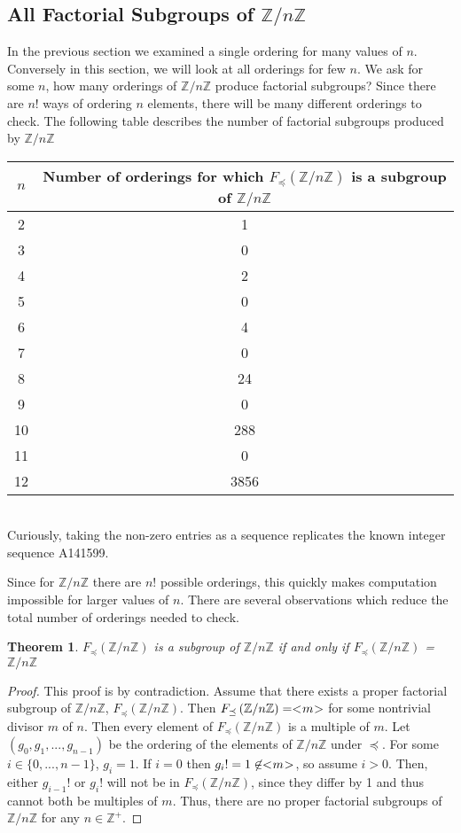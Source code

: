 \documentclass{article}
\newcommand{\ZZ}{\mathbb{Z}}
\newcommand{\ZnZ}{\ZZ/n\ZZ}
\newcommand{\FZ}{F_{\preceq}\left(\ZZ/n\ZZ\right)}
\newtheorem{theorem}{Theorem}
\begin{document}
\subsection{All Factorial Subgroups of $\ZZ/n\ZZ$}
In the previous section we examined a single ordering for many values of $n$. Conversely in this section, we will look at all orderings for few $n$. We ask for some $n$, how many orderings of $\ZZ/n\ZZ$ produce factorial subgroups? Since there are $n!$ ways of ordering $n$ elements, there will be many different orderings to check. The following table describes the number of factorial subgroups produced by $\ZZ/n\ZZ$

\begin{tabular}{|c|c|}
\hline
$n$ & Number of orderings for which $F_\preceq(\ZZ/n\ZZ)$ is a subgroup of $\ZZ/n\ZZ$\\
\hline
2 & 1\\
\hline
3 & 0\\
\hline
4 & 2\\
\hline
5 & 0\\
\hline
6 & 4\\
\hline
7 & 0\\
\hline
8 & 24\\
\hline
9 & 0\\
\hline
10 & 288\\
\hline
11 & 0\\
\hline
12 & 3856\\
\hline
\end{tabular} \vspace{0.1in}
\\Curiously, taking the non-zero entries as a sequence replicates the known integer sequence A141599.
\par Since for $\ZnZ$ there are $n!$ possible orderings, this quickly makes computation impossible for larger values of $n$. There are several observations which reduce the total number of orderings needed to check.
\begin{theorem}
$\FZ$ is a subgroup of $\ZnZ$ if and only if $\FZ$ = $\ZnZ$
\end{theorem}

\begin{proof} This proof is by contradiction. Assume that there exists a proper factorial subgroup of $\ZnZ$, $\FZ$. Then $\FZ=< \negmedspace m \negmedspace >$ for some nontrivial divisor $m$ of $n$. Then every element of $\FZ$ is a multiple of $m$. Let $(g_0,g_1,...,g_{n-1})$ be the ordering of the elements of $\ZnZ$ under $\preceq$. For some $i\in\{0,...,n-1\}$, $g_i=1$. If $i=0$ then $g_i!=1\not\in < \negmedspace m \negmedspace >$, so assume $i>0$. Then, either $g_{i-1}!$ or $g_i!$ will not be in $\FZ$, since they differ by 1 and thus cannot both be multiples of $m$. Thus, there are no proper factorial subgroups of $\ZnZ$ for any $n\in\mathbb{Z}^+$. 
\end{proof}
\end{document}
